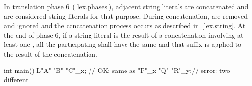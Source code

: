 \exitexample

\pnum
In translation phase 6~(\ref{lex.phases}), adjacent string literals are concatenated and
 are considered string literals for that
purpose. During concatenation,  are removed and ignored and
the concatenation process occurs as described in~\ref{lex.string}. At the end of phase
6, if a string literal is the result of a concatenation involving at least one
, all the participating
 shall have the same 
and that suffix is applied to the result of the concatenation.

\pnum
\enterexample
\begin{codeblock}
int main() {
  L"A" "B" "C"_x; // OK: same as 
  "P"_x "Q" "R"_y;// error: two different 
}
\end{codeblock}
\exitexample%
%
